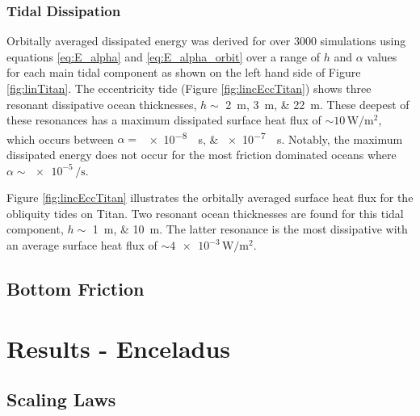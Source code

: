 \subsubsection{Tidal Dissipation \label{subsubsec:linTitan}}

Orbitally averaged dissipated energy was derived for over 3000 simulations using equations \ref{eq:E_alpha} and \ref{eq:E_alpha_orbit} over a range of $h$ and $\alpha$ values for each main tidal component as shown on the left hand side of Figure \ref{fig:linTitan}. The eccentricity tide (Figure \ref{fig:lincEccTitan}) shows three resonant dissipative ocean thicknesses, $h \sim$ \SIlist{2;3;22}{\metre}. These deepest of these resonances has a maximum dissipated surface heat flux of $\sim 10\, \si{\watt\per\square\metre}$, which occurs between $\alpha =$ \SIlist{e-8;e-7}{\per\second}. Notably, the maximum dissipated energy does not occur for the most friction dominated oceans where $\alpha \sim \num{e-5} \, \si{\per\second}$.

Figure \ref{fig:lincEccTitan} illustrates the orbitally averaged surface heat flux for the obliquity tides on Titan. Two resonant ocean thicknesses are found for this tidal component, $h \sim$ \SIlist{1;10}{\metre}. The latter resonance is the most dissipative with an average surface heat flux of $\sim \num{4e-3}\, \si{\watt\per\square\metre}$.


\subsection{Bottom Friction \label{subsec:botTitan}}

\section{Results - Enceladus \label{sec:results_Enceladus}}

\subsection{Scaling Laws \label{subsec:scaling}}